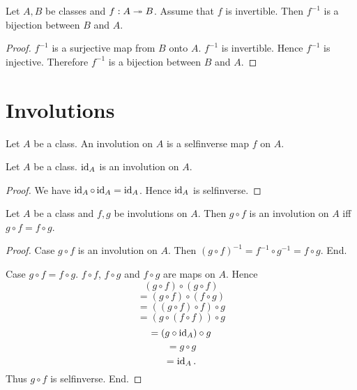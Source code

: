\documentclass[../../set-theory/set-theory.tex]{subfiles}
\begin{document}
  \begin{forthel}
    \begin{corollary}
      Let $A, B$ be classes and $f : A \twoheadrightarrow B$.
      Assume that $f$ is invertible.
      Then $f^{-1}$ is a bijection between $B$ and $A$.
    \end{corollary}
    \begin{proof}
      $f^{-1}$ is a surjective map from $B$ onto $A$.
      $f^{-1}$ is invertible.
      Hence $f^{-1}$ is injective.
      Therefore $f^{-1}$ is a bijection between $B$ and $A$.
    \end{proof}
  \end{forthel}


  \section{Involutions}

  \begin{forthel}
    \begin{definition}
      Let $A$ be a class.
      An involution on $A$ is a selfinverse map $f$ on $A$.
    \end{definition}
  \end{forthel}

  \begin{forthel}
    \begin{proposition}
      Let $A$ be a class.
      $\operatorname{id}_{A}$ is an involution on $A$.
    \end{proposition}
    \begin{proof}
      We have $\operatorname{id}_{A} \circ \operatorname{id}_{A} = \operatorname{id}_{A}$.
      Hence $\operatorname{id}_{A}$ is selfinverse.
    \end{proof}
  \end{forthel}

  \begin{forthel}
    \begin{proposition}
      Let $A$ be a class and $f, g$ be involutions on $A$.
      Then $g \circ f$ is an involution on $A$ iff $g \circ f = f \circ g$.
    \end{proposition}
    \begin{proof}
      Case $g \circ f$ is an involution on $A$.
        Then $(g \circ f)^{-1} = f^{-1} \circ g^{-1} = f \circ g$.
      End.

      Case $g \circ f = f \circ g$.
        $f \circ f$, $f \circ g$ and $f \circ g$ are maps on $A$.
        Hence
        \[  (g \circ f) \circ (g \circ f)       \]
        \[    = (g \circ f) \circ (f \circ g)   \]
        \[    = ((g \circ f) \circ f) \circ g   \]
        \[    = (g \circ (f \circ f)) \circ g   \]
        \[    = (g \circ \operatorname{id}_{A}) \circ g       \]
        \[    = g \circ g                       \]
        \[    = \operatorname{id}_{A}.                        \]
        Thus $g \circ f$ is selfinverse.
      End.
    \end{proof}
  \end{forthel}
\end{document}

